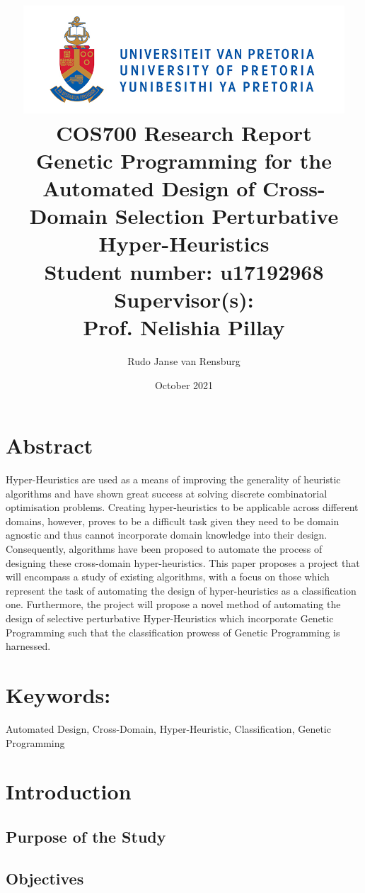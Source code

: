 \documentclass[a4paper,12pt]{article}
\title
{
   \includegraphics[width=12cm]{up-logo.jpg} \\
   \vspace{2cm}
   \textbf{COS700 Research Report} \\ \vspace{0.5cm}
   \textbf{Genetic Programming for the Automated Design of Cross-Domain Selection Perturbative Hyper-Heuristics } \\ \vspace{0.5cm}
   \textbf{Student number:} u17192968 \\ \vspace{0.5cm}
   \textbf{Supervisor(s)}: \\ Prof. Nelishia Pillay  
}
\author{Rudo Janse van Rensburg}
\date{October 2021}
\begin{document}
\maketitle

\newpage
\linespread{1.241}

\section*{Abstract}
    \par{Hyper-Heuristics are used as a means of improving the generality of heuristic algorithms and have shown great success at solving discrete combinatorial optimisation problems. Creating hyper-heuristics to be applicable across different domains, however, proves to be a difficult task given they need to be domain agnostic and thus cannot incorporate domain knowledge into their design. Consequently, algorithms have been proposed to automate the process of designing these cross-domain hyper-heuristics. This paper proposes a project that will encompass a study of existing algorithms, with a focus on those which represent the task of automating the design of hyper-heuristics as a classification one. Furthermore, the project will propose a novel method of automating the design of selective perturbative Hyper-Heuristics which incorporate Genetic Programming such that the classification prowess of Genetic Programming is harnessed.}

\section*{Keywords:}
    \par{Automated Design, Cross-Domain, Hyper-Heuristic, Classification, Genetic Programming}

\newpage

\section{Introduction}
    \subsection{Purpose of the Study}
        \par{

        }
    \subsection{Objectives}
    \par{
            
        }
\end{document}

